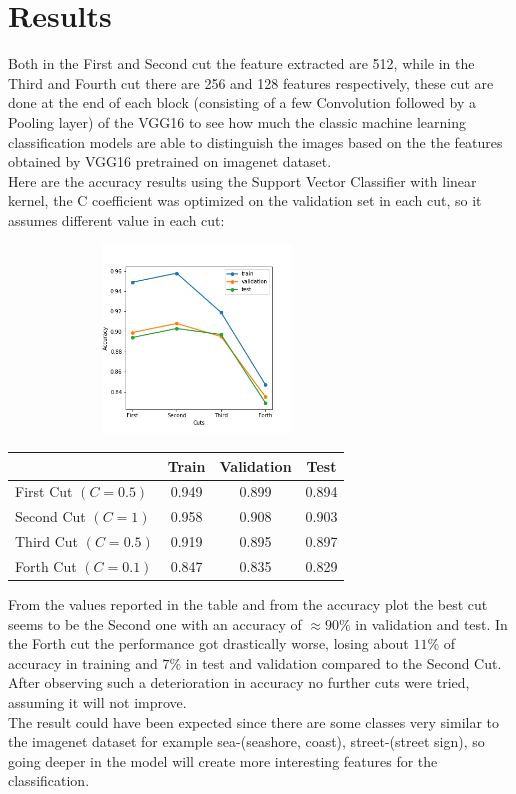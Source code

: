 \documentclass[12pt,a4paper]{article}
\begin{document}
\section*{Results}
Both in the First and Second cut the feature extracted are 512, while in the Third and Fourth cut there are 256 and 128 features respectively, these cut are done at the end of each block (consisting of a few Convolution followed by a Pooling layer) of the VGG16 to see how much the classic machine learning classification models are able to distinguish the images based on the the features obtained by VGG16 pretrained on imagenet dataset.\\
Here are the accuracy results using the Support Vector Classifier with linear kernel, the C coefficient was optimized on the validation set in each cut, so it assumes different value in each cut:
\begin{center}
  \includegraphics[width=10cm, height=5cm]{imgs/accuracy.png}
  \begin{tabular}{|l|c|c|c|}
    \hline
    & Train & Validation & Test\\
    \hline
    First Cut $(C=0.5)$ & 0.949 & 0.899 & 0.894\\
    \hline
    Second Cut $(C=1)$  & 0.958 & 0.908 & 0.903\\
    \hline
    Third Cut $(C=0.5)$ & 0.919 & 0.895 & 0.897\\
    \hline
    Forth Cut $(C=0.1)$ & 0.847 & 0.835 & 0.829\\
    \hline
  \end{tabular}
\end{center}

From the values reported in the table and from the accuracy plot the best cut seems to be the Second one with an accuracy of $\approx90\%$ in validation and test. In the Forth cut the performance got drastically worse, losing about $11\%$ of accuracy in training and $7\%$ in test and validation compared to the Second Cut.
After observing such a deterioration in accuracy no further cuts were tried, assuming it will not improve.\\
The result could have been expected since there are some classes very similar to the imagenet dataset for example sea-(seashore, coast), street-(street sign), so going deeper in the model will create more interesting features for the classification.
\end{document}
